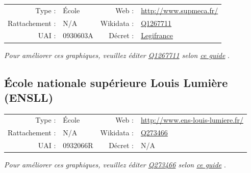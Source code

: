\documentclass[11pt,french,landscape]{article}
\begin{document}
\begin{tabular*}{0.45\textwidth}{rp{2cm}rl}  
\hline  
Type : & École & Web : &\href{http://www.supmeca.fr/}{http://www.supmeca.fr/} \\  
Rattachement : & N/A & Wikidata : & \href{https://www.wikidata.org/entity/Q1267711}{Q1267711} \\  
UAI : & 0930603A & Décret : & \href{http://www.legifrance.gouv.fr/affichTexte.do?dateTexte=&categorieLien=id&cidTexte=JORFTEXT000000429626&fastPos=1&fastReqId=1463704545&oldAction=rechExpTexteJorf}{Legifrance} \\  
\hline  
\end{tabular*}

\textit{\scriptsize Pour améliorer ces graphiques, veuillez éditer \href{https://www.wikidata.org/entity/Q1267711}{Q1267711}  selon \href{https://github.com/cpesr/wikidataESR/blob/master/Rmd/wikidataESR.md}{ce guide}}
.


\newpage

\hypertarget{uxe9cole-nationale-supuxe9rieure-louis-lumiuxe8re-ensll}{%
\subsection{École nationale supérieure Louis Lumière
(ENSLL)}\label{uxe9cole-nationale-supuxe9rieure-louis-lumiuxe8re-ensll}}

\begin{tabular*}{0.45\textwidth}{rp{2cm}rl}  
\hline  
Type : & École & Web : &\href{http://www.ens-louis-lumiere.fr/}{http://www.ens-louis-lumiere.fr/} \\  
Rattachement : & N/A & Wikidata : & \href{https://www.wikidata.org/entity/Q273466}{Q273466} \\  
UAI : & 0932066R & Décret : & N/A \\  
\hline  
\end{tabular*}

\textit{\scriptsize Pour améliorer ces graphiques, veuillez éditer \href{https://www.wikidata.org/entity/Q273466}{Q273466}  selon \href{https://github.com/cpesr/wikidataESR/blob/master/Rmd/wikidataESR.md}{ce guide}}
.

\end{document}
